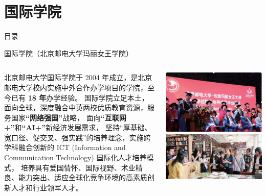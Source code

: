 \documentclass[aspectratio=169, utf8, fontset=windows]{beamer}
\begin{document}
\section{国际学院}

\begin{frame}{目录}
    \begin{multicols}{2}
        \tableofcontents[currentsection]
    \end{multicols}
\end{frame}

\begin{frame}{国际学院（北京邮电大学玛丽女王学院）}
    \begin{columns}
        \small
        \setlength{\parindent}{2em}

        北京邮电大学国际学院于 2004 年成立，是北京邮电大学校内实施中外合作办学项目的学院，至今已有 \textcolor{Fore}{\textbf{18 年}}办学经验。
        国际学院立足本土，面向全球，深度融合中英两校优质教育资源，服务国家\textcolor{Fore}{\textbf{“网络强国”}}战略，
        面向\textcolor{Fore}{\textbf{“互联网+”}}和\textcolor{Fore}{\textbf{“AI+”}}新经济发展需求，
        坚持“厚基础、宽口径、促交叉、强实践”的培养理念，实施跨学科融合创新的 ICT (Information and Communication Technology) 国际化人才培养模式，
        培养具有爱国情怀、国际视野、术业精良、能力突出、适应全球化竞争环境的高素质创新人才和行业领军人才。

        \centering
        \includegraphics[width=\textwidth]{./resources/10.png}
        \includegraphics[width=\textwidth]{./resources/11.png}
    \end{columns}
\end{frame}
\end{document}
